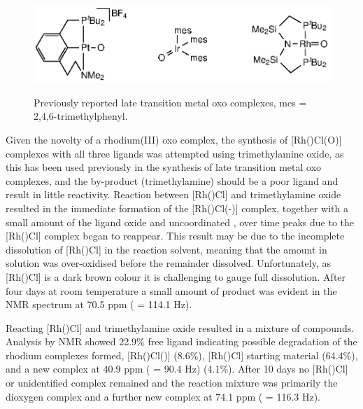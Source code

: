 \begin{figure}[htb]
\begin{center}
\vspace{0.5cm}
\includegraphics{../Figures/Rhodiumotheroxo.eps}
\caption[Previously reported late transition metal oxo complexes]{Previously reported late transition metal oxo complexes, mes = 2,4,6-trimethylphenyl.\cite{Poverenov2008, Verat2008, Tsvetkov2013}}
\vspace{0.2cm}
\label{Rhodiumotheroxo}
\end{center}
\end{figure}
\vspace{0.2cm}

Given the novelty of a rhodium(III) oxo complex, the synthesis of [Rh(\tBuxantphos)Cl(O)] complexes with all three \tBuxantphos{} ligands was attempted using trimethylamine oxide, as this has been used previously in the synthesis of late transition metal oxo complexes,\cite{Motherwell1993, Tsvetkov2013} and the by-product (trimethylamine) should be a poor ligand and result in little reactivity.    Reaction between [Rh(\tBusixantphos)Cl] and trimethylamine oxide resulted in the immediate formation of the [Rh(\tBusixantphos)Cl(-)] complex, together with a small amount of the ligand oxide and uncoordinated \tBusixantphos, over time peaks due to the [Rh(\tBusixantphos)Cl] complex began to reappear.  This result may be due to the incomplete dissolution of [Rh(\tBusixantphos)Cl] in the  reaction solvent, meaning that the amount in solution was over-oxidised before the remainder dissolved.  Unfortunately, as [Rh(\tBusixantphosk)Cl] is a dark brown colour it is challenging to gauge full dissolution.  After four days at room temperature a small amount of product was evident in the \phosphorus{} NMR spectrum at 70.5 ppm (\JRhP{} = 114.1 Hz).  

Reacting [Rh(\tButhixantphosk)Cl] and trimethylamine oxide resulted in a mixture of compounds.  Analysis by \phosphorus{} NMR showed 22.9\%{} free \tButhixantphos{} ligand indicating possible degradation of the rhodium complexes formed, [Rh(\tBusixantphosk)Cl()] (8.6\%{}), [Rh(\tButhixantphosk)Cl] starting material (64.4\%), and a new complex at 40.9 ppm (\JRhP{} = 90.4 Hz) (4.1\%).  After 10 days no [Rh(\tButhixantphosk)Cl] or unidentified complex remained and the reaction mixture was primarily the dioxygen complex and a further new complex at 74.1 ppm (\JRhP{} = 116.3 Hz).  

